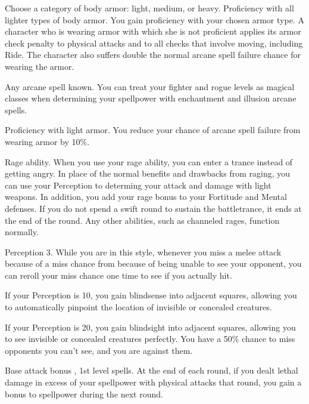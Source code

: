 Choose a category of body armor: light, medium, or heavy.
\featpre Proficiency with all lighter types of body armor.
\featben You gain proficiency with your chosen armor type.
A character who is wearing armor with which she is not proficient applies its armor check penalty to physical attacks and to all checks that involve moving, including Ride.
The character also suffers double the normal arcane spell failure chance for wearing the armor.


\featpre Any arcane spell known.
\featben You can treat your fighter and rogue levels as magical classes when determining your spellpower with enchantment and illusion arcane spells.

\featpre Proficiency with light armor.
\featben You reduce your chance of arcane spell failure from wearing armor by 10\%.

\featpre Rage ability.
\featben When you use your rage ability, you can enter a trance instead of getting angry.
In place of the normal benefits and drawbacks from raging, you can use your Perception to determing your attack and damage with light weapons.
In addition, you add your rage bonus to your Fortitude and Mental defenses.
If you do not spend a swift round to sustain the battletrance, it ends at the end of the round.
Any other abilities, such as channeled rages, function normally.

\featpre Perception 3.
\featben While you are in this style, whenever you miss a melee attack because of a miss chance from because of being unable to see your opponent, you can reroll your miss chance one time to see if you actually hit.
\par If your Perception is 10, you gain blindsense into adjacent squares, allowing you to automatically pinpoint the location of invisible or concealed creatures.
\par If your Perception is 20, you gain blindsight into adjacent squares, allowing you to see invisible or concealed creatures perfectly.
You have a 50\% chance to miss opponents you can't see, and you are  against them.

\featpres Base attack bonus , 1st level spells.
\featben At the end of each round, if you dealt lethal damage in excess of your spellpower with physical attacks that round, you gain a  bonus to spellpower during the next round.

